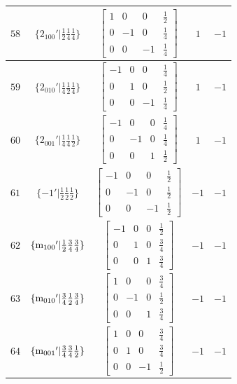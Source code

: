\documentclass[fleqn,8pt]{jsarticle}
\begin{document}
\begin{longtable}{ccccc}
$ 58 $ & $ \{2{}_{100}{}'|\frac{1}{2} \frac{1}{4} \frac{1}{4}\} $ & $ \begin{bmatrix} 1 & 0 & 0 & \frac{1}{2} \\ 0 & -1 & 0 & \frac{1}{4} \\ 0 & 0 & -1 & \frac{1}{4} \end{bmatrix} $ & $ 1 $ & $ -1 $ \\ \hline
$ 59 $ & $ \{2{}_{010}{}'|\frac{1}{4} \frac{1}{2} \frac{1}{4}\} $ & $ \begin{bmatrix} -1 & 0 & 0 & \frac{1}{4} \\ 0 & 1 & 0 & \frac{1}{2} \\ 0 & 0 & -1 & \frac{1}{4} \end{bmatrix} $ & $ 1 $ & $ -1 $ \\ \hline
$ 60 $ & $ \{2{}_{001}{}'|\frac{1}{4} \frac{1}{4} \frac{1}{2}\} $ & $ \begin{bmatrix} -1 & 0 & 0 & \frac{1}{4} \\ 0 & -1 & 0 & \frac{1}{4} \\ 0 & 0 & 1 & \frac{1}{2} \end{bmatrix} $ & $ 1 $ & $ -1 $ \\ \hline
$ 61 $ & $ \{-1{}'|\frac{1}{2} \frac{1}{2} \frac{1}{2}\} $ & $ \begin{bmatrix} -1 & 0 & 0 & \frac{1}{2} \\ 0 & -1 & 0 & \frac{1}{2} \\ 0 & 0 & -1 & \frac{1}{2} \end{bmatrix} $ & $ -1 $ & $ -1 $ \\ \hline
$ 62 $ & $ \{{\rm m}_{100}{}'|\frac{1}{2} \frac{3}{4} \frac{3}{4}\} $ & $ \begin{bmatrix} -1 & 0 & 0 & \frac{1}{2} \\ 0 & 1 & 0 & \frac{3}{4} \\ 0 & 0 & 1 & \frac{3}{4} \end{bmatrix} $ & $ -1 $ & $ -1 $ \\ \hline
$ 63 $ & $ \{{\rm m}_{010}{}'|\frac{3}{4} \frac{1}{2} \frac{3}{4}\} $ & $ \begin{bmatrix} 1 & 0 & 0 & \frac{3}{4} \\ 0 & -1 & 0 & \frac{1}{2} \\ 0 & 0 & 1 & \frac{3}{4} \end{bmatrix} $ & $ -1 $ & $ -1 $ \\ \hline
$ 64 $ & $ \{{\rm m}_{001}{}'|\frac{3}{4} \frac{3}{4} \frac{1}{2}\} $ & $ \begin{bmatrix} 1 & 0 & 0 & \frac{3}{4} \\ 0 & 1 & 0 & \frac{3}{4} \\ 0 & 0 & -1 & \frac{1}{2} \end{bmatrix} $ & $ -1 $ & $ -1 $ \\
\end{longtable}
\end{document}
